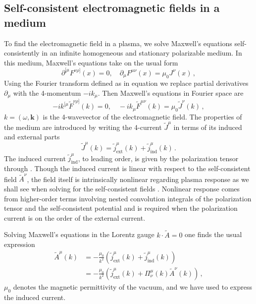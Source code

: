 \subsection{Self-consistent electromagnetic fields in a medium}\label{sec:Maxwell}
To find the electromagnetic field in a plasma, we solve Maxwell's equations self-consistently in an infinite homogeneous and stationary polarizable medium. In this medium, Maxwell's equations take on the usual form \cite{melrose2008quantum}
\begin{equation}
\partial^{[\mu}F^{\nu \rho]}(x) =0, \quad \partial_{\mu}F^{\mu \nu}(x) = \mu_0 J^{\nu}(x)\,,
\end{equation}
Using the Fourier transform defined as in equation  we replace partial derivatives $\partial_\mu$ with the 4-momentum $-i k_\mu$. Then Maxwell's equations in Fourier space are
\begin{equation}
-i k^{[\mu}\widetilde{F}^{\nu \rho]}(k) =0, \quad -i k_{\mu}\widetilde{F}^{\mu \nu}(k) = \mu_0 \widetilde{J}^{\nu}(k)\,,
\end{equation}
$k=(\omega, \boldsymbol{k})$ is the 4-wavevector of the electromagnetic field. The properties of the medium are introduced by writing the 4-current $\widetilde{J}^{\mu}$ in terms of its induced and external parts
\begin{equation}
 \widetilde{J}^{\mu}(k) = \widetilde{j}_{\mathrm{ext}}^{\mu}(k)+ \widetilde{j}_{\mathrm{ind}}^{\mu}(k)\,.
\end{equation}
The induced current $\widetilde{j}_{\mathrm{ind}}^{\mu}$, to leading order, is given by the polarization tensor through . Though the induced current is linear with respect to the self-consistent field $\widetilde{A}^{\nu}$, the field itself is intrinsically nonlinear regarding plasma response as we shall see when solving for the self-consistent fields . Nonlinear response comes from higher-order terms involving nested convolution integrals of the polarization tensor and the self-consistent potential and is required when the polarization current is on the order of the external current.

Solving Maxwell's equations in the Lorentz gauge $k \cdot \widetilde{A}=0$ one finds the usual expression
\begin{equation}\label{eq:Amu}
\begin{split}
\widetilde{A}^{\mu}(k)&= -\frac{\mu_0}{k^2}\left(\widetilde{j}_{\mathrm{ext}}^{\mu}(k)+ \widetilde{j}_{\mathrm{ind}}^{\mu}(k)\right)\\
&= -\frac{\mu_0}{k^2}\left(\widetilde{j}_{\mathrm{ext}}^{\mu}(k)+  \Pi^\mu_\nu(k) \widetilde{A}^\nu(k)\right)\,,
\end{split}
\end{equation}
$\mu_0$ denotes the magnetic permittivity of the vacuum, and we have used  to express the induced current. 

